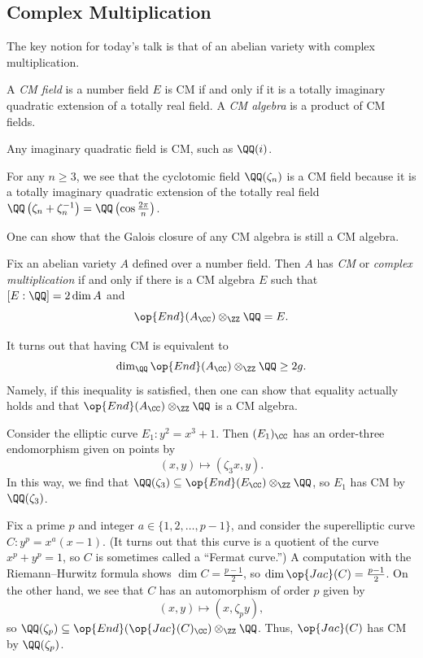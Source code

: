 \documentclass{article}
\begin{document}
\subsection{Complex Multiplication}
The key notion for today's talk is that of an abelian variety with complex multiplication.
\begin{definition}[CM]
	A \textit{CM field} is a number field $E$ is CM if and only if it is a totally imaginary quadratic extension of a totally real field. A \textit{CM algebra} is a product of CM fields.
\end{definition}
\begin{example}
	Any imaginary quadratic field is CM, such as $\QQ(i)$.
\end{example}
\begin{example}
	For any $n\ge3$, we see that the cyclotomic field $\QQ(\zeta_n)$ is a CM field because it is a totally imaginary quadratic extension of the totally real field $\QQ\left(\zeta_n+\zeta_n^{-1}\right)=\QQ\left(\cos\frac{2\pi}n\right)$.
\end{example}
\begin{remark}
	One can show that the Galois closure of any CM algebra is still a CM algebra.
\end{remark}
\begin{definition}
	Fix an abelian variety $A$ defined over a number field. Then $A$ has \textit{CM} or \textit{complex multiplication} if and only if there is a CM algebra $E$ such that $[E:\QQ]=2\dim A$ and
	\[\op{End}(A_\CC)\otimes_\ZZ\QQ=E.\]
\end{definition}
\begin{remark} \label{rem:lower-bound-cm}
	It turns out that having CM is equivalent to
	\[\dim_\QQ\op{End}(A_\CC)\otimes_\ZZ\QQ\ge 2g.\]
	Namely, if this inequality is satisfied, then one can show that equality actually holds and that $\op{End}(A_\CC)\otimes_\ZZ\QQ$ is a CM algebra.
\end{remark}
\begin{example}
	Consider the elliptic curve $E_1\colon y^2=x^3+1$. Then $(E_1)_\CC$ has an order-three endomorphism given on points by
	\[(x,y)\mapsto(\zeta_3x,y).\]
	In this way, we find that $\QQ(\zeta_3)\subseteq\op{End}(E_\CC)\otimes_\ZZ\QQ$, so $E_1$ has CM by $\QQ(\zeta_3)$.
\end{example}
\begin{example}
	Fix a prime $p$ and integer $a\in\{1,2,\ldots,p-1\}$, and consider the superelliptic curve $C\colon y^p=x^a(x-1)$. (It turns out that this curve is a quotient of the curve $x^p+y^p=1$, so $C$ is sometimes called a ``Fermat curve.'') A computation with the Riemann--Hurwitz formula shows $\dim C=\frac{p-1}2$, so $\dim\op{Jac}(C)=\frac{p-1}2$. On the other hand, we see that $C$ has an automorphism of order $p$ given by
	\[(x,y)\mapsto(x,\zeta_py),\]
	so $\QQ(\zeta_p)\subseteq\op{End}(\op{Jac}(C)_\CC)\otimes_\ZZ\QQ$. Thus, $\op{Jac}(C)$ has CM by $\QQ(\zeta_p)$.
\end{example}
\end{document}

